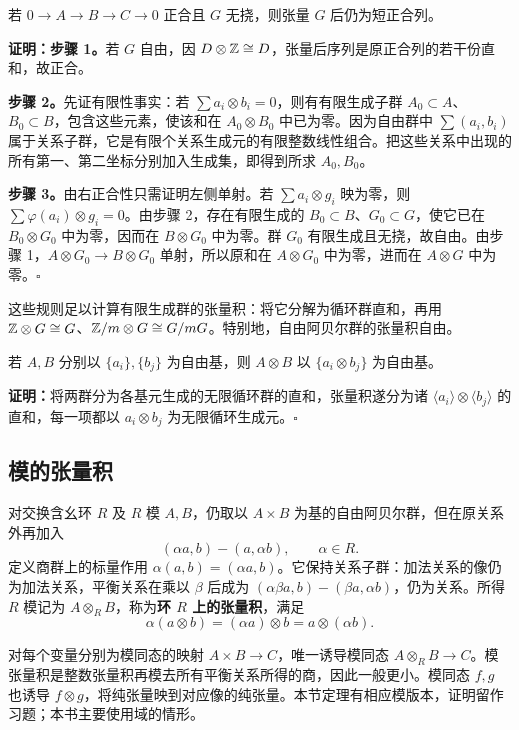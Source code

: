 若 $0\to A\to B\to C\to0$ 正合且 $G$ 无挠，则张量 $G$ 后仍为短正合列。

\textbf{证明：步骤 1。}若 $G$ 自由，因 $D\otimes\mathbb{Z}\cong D$，张量后序列是原正合列的若干份直和，故正合。

\textbf{步骤 2。}先证有限性事实：若 $\sum a_i\otimes b_i=0$，则有有限生成子群 $A_0\subset A$、$B_0\subset B$，包含这些元素，使该和在 $A_0\otimes B_0$ 中已为零。因为自由群中 $\sum(a_i,b_i)$ 属于关系子群，它是有限个关系生成元的有限整数线性组合。把这些关系中出现的所有第一、第二坐标分别加入生成集，即得到所求 $A_0,B_0$。

\textbf{步骤 3。}由右正合性只需证明左侧单射。若 $\sum a_i\otimes g_i$ 映为零，则 $\sum\varphi(a_i)\otimes g_i=0$。由步骤 2，存在有限生成的 $B_0\subset B$、$G_0\subset G$，使它已在 $B_0\otimes G_0$ 中为零，因而在 $B\otimes G_0$ 中为零。群 $G_0$ 有限生成且无挠，故自由。由步骤 1，$A\otimes G_0\to B\otimes G_0$ 单射，所以原和在 $A\otimes G_0$ 中为零，进而在 $A\otimes G$ 中为零。\hfill$\square$

这些规则足以计算有限生成群的张量积：将它分解为循环群直和，再用 $\mathbb{Z}\otimes G\cong G$、$\mathbb{Z}/m\otimes G\cong G/mG$。特别地，自由阿贝尔群的张量积自由。

若 $A,B$ 分别以 $\{a_i\},\{b_j\}$ 为自由基，则 $A\otimes B$ 以 $\{a_i\otimes b_j\}$ 为自由基。

\textbf{证明：}将两群分为各基元生成的无限循环群的直和，张量积遂分为诸 $\langle a_i\rangle\otimes\langle b_j\rangle$ 的直和，每一项都以 $a_i\otimes b_j$ 为无限循环生成元。\hfill$\square$

\subsection*{模的张量积}
对交换含幺环 $R$ 及 $R$ 模 $A,B$，仍取以 $A\times B$ 为基的自由阿贝尔群，但在原关系外再加入
\[
(\alpha a,b)-(a,\alpha b),\qquad\alpha\in R.
\]
定义商群上的标量作用 $\alpha(a,b)=(\alpha a,b)$。它保持关系子群：加法关系的像仍为加法关系，平衡关系在乘以 $\beta$ 后成为 $(\alpha\beta a,b)-(\beta a,\alpha b)$，仍为关系。所得 $R$ 模记为 $A\otimes_RB$，称为\textbf{环 $R$ 上的张量积}，满足
\[
\alpha(a\otimes b)=(\alpha a)\otimes b=a\otimes(\alpha b).
\]

对每个变量分别为模同态的映射 $A\times B\to C$，唯一诱导模同态 $A\otimes_RB\to C$。模张量积是整数张量积再模去所有平衡关系所得的商，因此一般更小。模同态 $f,g$ 也诱导 $f\otimes g$，将纯张量映到对应像的纯张量。本节定理有相应模版本，证明留作习题；本书主要使用域的情形。

